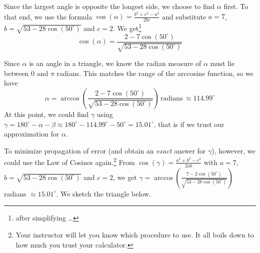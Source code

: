 \documentclass{ximera}
\begin{document}
\begin{example}
\begin{explanation}
\begin{enumerate}
 

Since the largest angle is opposite the longest side, we choose to find $\alpha$ first. To that end, we use the formula $\cos(\alpha) = \frac{b^2+c^2-a^2}{2bc}$ and substitute $a = 7$, $b =  \sqrt{53-28\cos\left(50^{\circ}\right)}$ and $c = 2$. We get\footnote{after simplifying \ldots} \[\cos(\alpha) = \frac{2-7\cos\left(50^{\circ}\right)}{\sqrt{53-28\cos\left(50^{\circ}\right)}}\]  

 

Since $\alpha$ is an angle in a triangle, we know the radian measure of $\alpha$ must lie between $0$ and $\pi$ radians.  This matches the range of the arccosine function, so we have \[\alpha = \arccos\left(\frac{2-7\cos\left(50^{\circ}\right)}{\sqrt{53-28\cos\left(50^{\circ} \right)}}\right) \, \text{radians} \, \approx  114.99^{\circ}\] At this point, we could find $\gamma$ using $\gamma = 180^{\circ} - \alpha - \beta \approx 180^{\circ} - 114.99^{\circ} - 50^{\circ} = 15.01^{\circ}$, that is if we trust our approximation for $\alpha$. 

 

To minimize propagation of error (and obtain an \textit{exact} answer for $\gamma$), however, we could use the Law of Cosines again.\footnote{Your instructor will let you know which procedure to use. It all boils down to how much you trust your calculator.} From $\cos(\gamma) = \frac{a^2+b^2-c^2}{2ab}$ with $a = 7$, $b = \sqrt{53-28\cos\left(50^{\circ} \right)}$ and $c=2$, we get  $\gamma = \arccos\left(\frac{7-2 \cos\left(50^{\circ}\right)}{\sqrt{53-28\cos\left(50^{\circ} \right)}} \right)$ radians $\approx 15.01^{\circ}$.  We sketch the triangle below.

\begin{image}
\end{image}
\end{enumerate}
\end{explanation}
\end{example}
\end{document}
